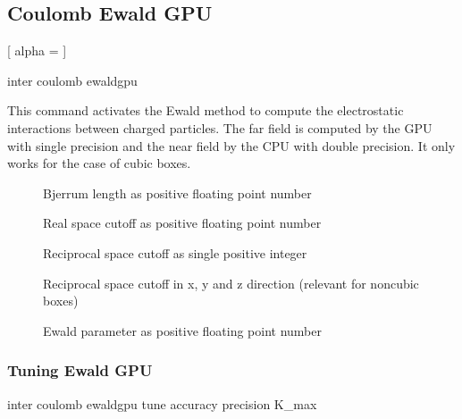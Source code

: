 \subsection{Coulomb Ewald GPU}
\label{sec:coulombewald}

\begin{pysyntax}
	[
		alpha = 
	]
	\begin{features}
	\end{features}
\end{pysyntax}
\begin{essyntax}
  inter coulomb  ewaldgpu 
    
  \begin{features}
  \end{features}
\end{essyntax}

This command activates the Ewald method to compute the electrostatic
interactions between charged particles.  The far field is computed by the GPU with single precision and the near field by the CPU with double precision. It only works for the case of cubic boxes.
\begin{description}
\item[] Bjerrum length as positive floating point number
\item[] Real space cutoff as positive floating point number
\item[] Reciprocal space cutoff as single positive integer
\item[] Reciprocal space cutoff in x, y and z direction  (relevant for noncubic boxes)
\item[] Ewald parameter as positive floating point number
\end{description}

\subsubsection{Tuning Ewald GPU}
\label{ssec:tuneewaldgpu}
\begin{essyntax}
  inter coulomb  ewaldgpu tune
  accuracy  precision 
  K_max 
  \begin{features}
  \end{features}
\end{essyntax}

